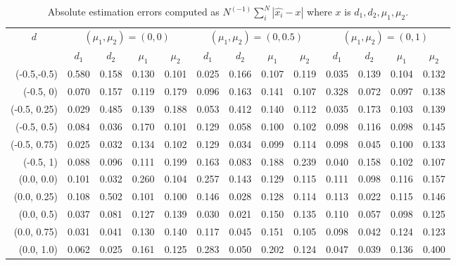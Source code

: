 \documentclass[11pt,fleqn]{article}
\begin{document}
{\begin{landscape}
	\begin{table}[htbp]
		\centering
		\caption{Absolute estimation errors computed as $ N^{(-1)}\sum_{i}^{N}|\widehat{x_i}-x |$ where $ x $ is  $d_1,d_2,\mu_1, \mu_2$.}
		\begin{tabular}{|r|rrrr|rrrr|rrrr|}
			\hline
			\multicolumn{1}{|c|}{\multirow{2}[4]{*}{$ d $}} & \multicolumn{4}{c|}{$ (\mu_1,\mu_2)=(0,0)$}    & \multicolumn{4}{c|}{$ (\mu_1,\mu_2)=(0,0.5)$}  & \multicolumn{4}{c|}{$ (\mu_1,\mu_2)=(0,1)$} \\
			\cline{2-13}    \multicolumn{1}{|c|}{} & \multicolumn{1}{c}{$ d_1 $} & \multicolumn{1}{c}{$ d_2$} & \multicolumn{1}{c}{$\mu_1$} & \multicolumn{1}{c|}{$ \mu_2 $} & \multicolumn{1}{c}{$d_1$} & \multicolumn{1}{c}{$d_2$} & \multicolumn{1}{c}{$\mu_1$} & \multicolumn{1}{c|}{$\mu_2$} & \multicolumn{1}{c}{$ d_1 $} & \multicolumn{1}{c}{$d_2$} & \multicolumn{1}{c}{$\mu_1$} & \multicolumn{1}{c|}{$\mu_2$} \\
			\hline
			(-0.5,-0.5) & 0.580 & 0.158 & 0.130 & 0.101 & 0.025 & 0.166 & 0.107 & 0.119 & 0.035 & 0.139 & 0.104 & 0.132 \\
			(-0.5, 0) & 0.070 & 0.157 & 0.119 & 0.179 & 0.096 & 0.163 & 0.141 & 0.107 & 0.328 & 0.072 & 0.097 & 0.138 \\
			(-0.5, 0.25) & 0.029 & 0.485 & 0.139 & 0.188 & 0.053 & 0.412 & 0.140 & 0.112 & 0.035 & 0.173 & 0.103 & 0.139 \\
			(-0.5, 0.5) & 0.084 & 0.036 & 0.170 & 0.101 & 0.129 & 0.058 & 0.100 & 0.102 & 0.098 & 0.116 & 0.098 & 0.145 \\
			(-0.5, 0.75) & 0.025 & 0.032 & 0.134 & 0.102 & 0.129 & 0.034 & 0.099 & 0.114 & 0.098 & 0.045 & 0.100 & 0.133 \\
			(-0.5, 1) & 0.088 & 0.096 & 0.111 & 0.199 & 0.163 & 0.083 & 0.188 & 0.239 & 0.040 & 0.158 & 0.102 & 0.107 \\
			\hline
			(0.0, 0.0) & 0.101 & 0.032 & 0.260 & 0.104 & 0.257 & 0.143 & 0.129 & 0.115 & 0.111 & 0.098 & 0.116 & 0.157 \\
			(0.0, 0.25) & 0.108 & 0.502 & 0.101 & 0.100 & 0.146 & 0.028 & 0.128 & 0.114 & 0.113 & 0.022 & 0.115 & 0.146 \\
			(0.0, 0.5) & 0.037 & 0.081 & 0.127 & 0.139 & 0.030 & 0.021 & 0.150 & 0.135 & 0.110 & 0.057 & 0.098 & 0.125 \\
			(0.0, 0.75) & 0.031 & 0.041 & 0.130 & 0.140 & 0.117 & 0.045 & 0.151 & 0.105 & 0.098 & 0.042 & 0.124 & 0.123 \\
			(0.0, 1.0) & 0.062 & 0.025 & 0.161 & 0.125 & 0.283 & 0.050 & 0.202 & 0.124 & 0.047 & 0.039 & 0.136 & 0.400 \\

\end{tabular}
\end{table}
\end{landscape}}
\end{document}
